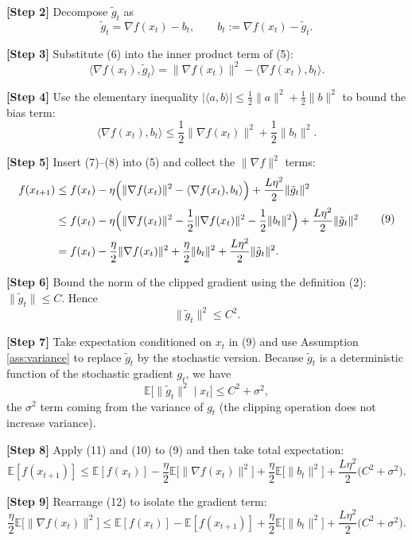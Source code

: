 \documentclass{article}
\newcommand{\E}{\mathbb{E}}
\begin{document}
\noindent\textbf{[Step 2]} Decompose $\tilde g_t$ as
\[
\tilde g_t = \nabla f(x_t)-b_t, \qquad
b_t:=\nabla f(x_t)-\tilde g_t .
\tag{6}
\]

\noindent\textbf{[Step 3]} Substitute (6) into the inner product term of (5):
\[
\langle\nabla f(x_t),\tilde g_t\rangle
= \|\nabla f(x_t)\|^{2}-\langle\nabla f(x_t),b_t\rangle .
\tag{7}
\]

\noindent\textbf{[Step 4]} Use the elementary inequality
$|\langle a,b\rangle|\le\frac12\|a\|^{2}+\frac12\|b\|^{2}$ to bound the bias term:
\[
\langle\nabla f(x_t),b_t\rangle
\le\frac12\|\nabla f(x_t)\|^{2}+\frac12\|b_t\|^{2}.
\tag{8}
\]

\noindent\textbf{[Step 5]} Insert (7)–(8) into (5) and collect the $\|\nabla f\|^{2}$
terms:
\[
\begin{aligned}
f(x_{t+1})
&\le f(x_t)-\eta\Bigl(\|\nabla f(x_t)\|^{2}
-\langle\nabla f(x_t),b_t\rangle\Bigr)
+\frac{L\eta^{2}}{2}\|\tilde g_t\|^{2}\\[2pt]
&\le f(x_t)-\eta\Bigl(\|\nabla f(x_t)\|^{2}
-\frac12\|\nabla f(x_t)\|^{2}
-\frac12\|b_t\|^{2}\Bigr)
+\frac{L\eta^{2}}{2}\|\tilde g_t\|^{2}\\[2pt]
&= f(x_t)-\frac{\eta}{2}\|\nabla f(x_t)\|^{2}
+\frac{\eta}{2}\|b_t\|^{2}
+\frac{L\eta^{2}}{2}\|\tilde g_t\|^{2}.
\end{aligned}
\tag{9}
\]

\noindent\textbf{[Step 6]} Bound the norm of the clipped gradient using the
definition (2): $\|\tilde g_t\|\le C$. Hence
\[
\|\tilde g_t\|^{2}\le C^{2}.
\tag{10}
\]

\noindent\textbf{[Step 7]} Take expectation conditioned on $x_t$ in (9) and use
Assumption \ref{ass:variance} to replace $\tilde g_t$ by the stochastic version.
Because $\tilde g_t$ is a deterministic function of the stochastic gradient $g_t$,
we have
\[
\E\bigl[\|\tilde g_t\|^{2}\mid x_t\bigr]
\le C^{2}+\sigma^{2},
\tag{11}
\]
the $\sigma^{2}$ term coming from the variance of $g_t$ (the clipping operation
does not increase variance).

\noindent\textbf{[Step 8]} Apply (11) and (10) to (9) and then take total
expectation:
\[
\E[f(x_{t+1})]\le \E[f(x_t)]-\frac{\eta}{2}\E\!\bigl[\|\nabla f(x_t)\|^{2}\bigr]
+\frac{\eta}{2}\E\!\bigl[\|b_t\|^{2}\bigr]
+\frac{L\eta^{2}}{2}\bigl(C^{2}+\sigma^{2}\bigr).
\tag{12}
\]

\noindent\textbf{[Step 9]} Rearrange (12) to isolate the gradient term:
\[
\frac{\eta}{2}\E\!\bigl[\|\nabla f(x_t)\|^{2}\bigr]
\le \E[f(x_t)]-\E[f(x_{t+1})]
+\frac{\eta}{2}\E\!\bigl[\|b_t\|^{2}\bigr]
+\frac{L\eta^{2}}{2}\bigl(C^{2}+\sigma^{2}\bigr).
\tag{13}
\]
\end{document}

